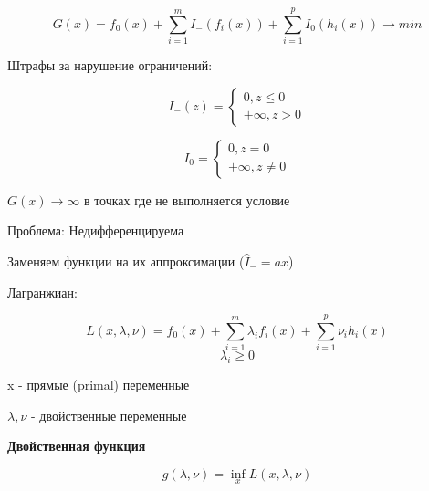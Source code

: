 \documentclass[a4paper, 12pt]{article}
\begin{document}
\[G(x) = f_0(x) + \sum_{i = 1}^m I_{-}(f_i(x)) + \sum_{i = 1}^p I_0(h_i(x)) \rightarrow min\]

Штрафы за нарушение ограничений:

\[I_{-}(z) = \begin{cases}
    0, z \leq 0 \\
    + \infty, z > 0 
\end{cases}\]

\[I_{0} = \begin{cases}
    0, z = 0 \\
    + \infty, z \neq 0 
\end{cases}\]

\(G(x) \rightarrow \infty\) в точках где не выполняется условие

Проблема: Недифференцируема

Заменяем функции на их аппроксимации ($\hat{I}_{-} = ax$)

Лагранжиан:

\[L(x, \lambda, \nu) = f_0(x) + \sum_{i = 1}^m \lambda_i f_i(x) + \sum_{i = 1}^p \nu_i h_i(x)\]
\[\lambda_i \geq 0\]

x - прямые (primal) переменные

$\lambda, \nu$ - двойственные переменные

\textbf{Двойственная функция}

\[g(\lambda, \nu) = \inf_{x} L(x, \lambda, \nu)\]
\end{document}
